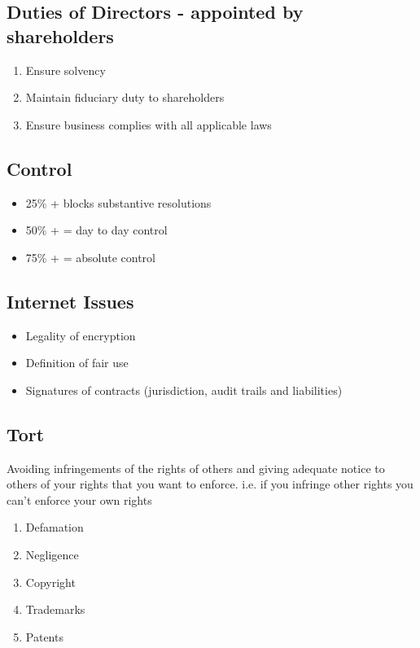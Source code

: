 \documentclass{article}
\begin{document}
\begin{multicols}{2}
\subsection{Duties of Directors - appointed by shareholders}
\begin{enumerate}
    \item Ensure solvency
    \item Maintain fiduciary duty to shareholders
    \item Ensure business complies with all applicable laws
\end{enumerate}

\subsection{Control}
\begin{itemize}
    \item 25\% + blocks substantive resolutions
    \item 50\% + = day to day control
    \item 75\% + = absolute control
\end{itemize}

\subsection{Internet Issues}
\begin{itemize}
    \item Legality of encryption
    \item Definition of fair use
    \item Signatures of contracts (jurisdiction, audit trails and liabilities)
\end{itemize}

\subsection{Tort}
Avoiding infringements of the rights of others and giving adequate notice to others of your rights that you want to enforce. i.e. if you infringe other rights you can't enforce your own rights
\begin{enumerate}
    \item Defamation
    \item Negligence
    \item Copyright
    \item Trademarks
    \item Patents
\end{enumerate}


\end{multicols}
\end{document}
